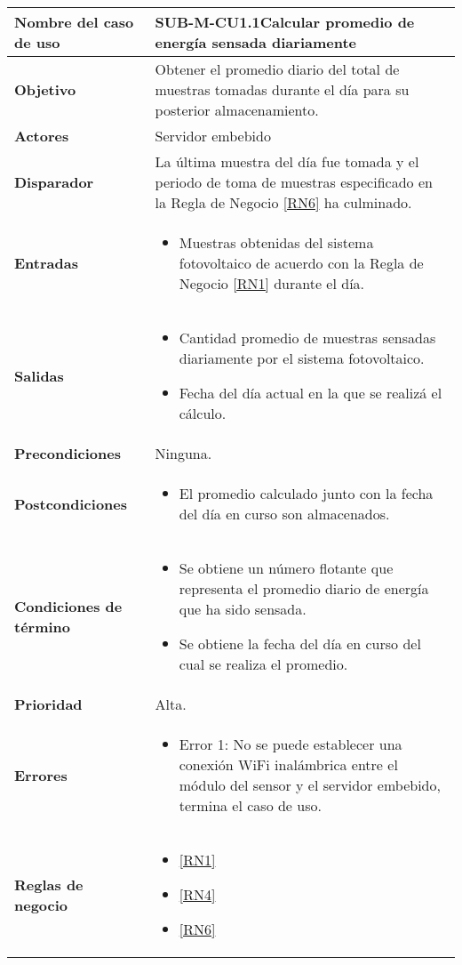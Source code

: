 \begin{longtable}{|J{5cm}|J{10.3cm}|}
	\hline
	\textbf{Nombre del caso de uso} &
		SUB-M-CU1.1Calcular promedio de energía sensada diariamente \\ \hline
	\textbf{Objetivo} &
		Obtener el promedio diario del total de muestras tomadas durante el día para su posterior almacenamiento. \\ \hline
	\textbf{Actores} &
		Servidor embebido \\ \hline 
	\textbf{Disparador} & 
		La última muestra del día fue tomada y el periodo de toma de muestras especificado en la Regla de Negocio \ref{RN6} ha culminado. \\ \hline 
	\textbf{Entradas} & 
		\begin{itemize}
				\item Muestras obtenidas del sistema fotovoltaico de acuerdo con la Regla de Negocio \ref{RN1} durante el día.
		\end{itemize}\\ \hline 
	\textbf{Salidas} & 
		\begin{itemize}
			\item Cantidad promedio de muestras sensadas diariamente por el sistema fotovoltaico.
			\item Fecha del día actual en la que se realizá el cálculo.
		\end{itemize} \\ \hline
	\textbf{Precondiciones} &
		Ninguna.\\ \hline
	\textbf{Postcondiciones} &
		\begin{itemize}
			\item El promedio calculado junto con la fecha del día en curso son almacenados.
		\end{itemize}\\ \hline
	\textbf{Condiciones de término} & 
		\begin{itemize}
			\item Se obtiene un número flotante que representa el promedio diario de energía que ha sido sensada.
			\item Se obtiene la fecha del día en curso del cual se realiza el promedio.
		\end{itemize} \\ \hline 
	\textbf{Prioridad} & 
		Alta. \\ \hline
	\textbf{Errores} & 
		\begin{itemize}
			\item \label{SUB-M-CU1:Error1} Error 1: No se puede establecer una conexión WiFi inalámbrica entre el módulo del sensor y el servidor embebido, termina el caso de uso.
		\end{itemize} \\ \hline
	\textbf{Reglas de negocio} & 
		\begin{itemize}
		    \item \ref{RN1}
			\item \ref{RN4}
			\item \ref{RN6}
		\end{itemize} \\ \hline

\end{longtable}

